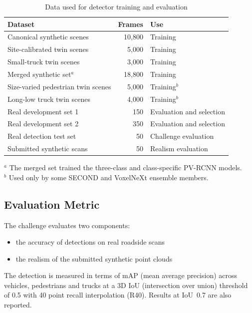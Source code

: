 \documentclass[conference]{IEEEtran}
\begin{document}
\begin{table}[t]
\caption{Data used for detector training and evaluation}
\label{tab:dataset}
\centering
\begin{tabular}{lrl}
\hline
\textbf{Dataset} & \textbf{Frames} & \textbf{Use} \\
\hline
Canonical synthetic scenes   & 10,800 & Training \\
Site-calibrated twin scenes  & 5,000  & Training \\
Small-truck twin scenes      & 3,000  & Training \\
\hline
Merged synthetic set$^{a}$   & 18,800 & Training \\
\hline
Size-varied pedestrian twin scenes & 5,000 & Training$^{b}$ \\
Long-low truck twin scenes   & 4,000  & Training$^{b}$ \\
\hline
Real development set 1       & 150 & Evaluation and selection \\
Real development set 2       & 350 & Evaluation and selection \\
Real detection test set      & 50  & Challenge evaluation \\
Submitted synthetic scans    & 50  & Realism evaluation \\
\hline
\end{tabular}

\smallskip
\footnotesize
$^{a}$ The merged set trained the three-class and class-specific PV-RCNN models. \\
$^{b}$ Used only by some SECOND and VoxelNeXt ensemble members.
\end{table}

\subsection{Evaluation Metric}

The challenge evaluates two components:

\begin{itemize}
    \item the accuracy of detections on
real roadside scans
    \item the realism of the submitted synthetic point
clouds
\end{itemize}

The detection is measured in terms of mAP (mean average precision) across vehicles, pedestrians and trucks at a 3D IoU (intersection over union) threshold of 0.5 with 40 point recall interpolation (R40). Results at IoU~0.7 are also reported.
\end{document}
